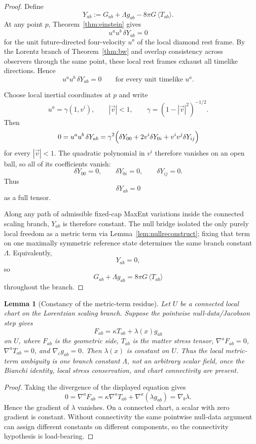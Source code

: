 \documentclass[11pt]{article}
\newtheorem{lemma}[theorem]{Lemma}
\begin{document}
\begin{proof}
Define
\[
Y_{ab}:=G_{ab}+\Lambda g_{ab}-8\pi G\,\langle T_{ab}\rangle.
\]
At any point $p$, Theorem~\ref{thm:einstein} gives
\[
u^a u^b\,\delta Y_{ab}=0
\]
for the unit future-directed four-velocity $u^a$ of the local diamond rest frame. By the Lorentz branch of Theorem~\ref{thm:bw} and overlap consistency across observers through the same point, these local rest frames exhaust all timelike directions. Hence
\[
u^a u^b\,\delta Y_{ab}=0
\qquad
\text{for every unit timelike }u^a.
\]

Choose local inertial coordinates at $p$ and write
\[
u^a=\gamma(1,v^i),
\qquad
|\vec v|<1,
\qquad
\gamma=(1-|\vec v|^2)^{-1/2}.
\]
Then
\[
0=u^a u^b\,\delta Y_{ab}
=
\gamma^2\Bigl(\delta Y_{00}+2v^i\delta Y_{0i}+v^iv^j\delta Y_{ij}\Bigr)
\]
for every $|\vec v|<1$. The quadratic polynomial in $v^i$ therefore vanishes on an open ball, so all of its coefficients vanish:
\[
\delta Y_{00}=0,\qquad
\delta Y_{0i}=0,\qquad
\delta Y_{ij}=0.
\]
Thus
\[
\delta Y_{ab}=0
\]
as a full tensor.

Along any path of admissible fixed-cap MaxEnt variations inside the connected scaling branch, $Y_{ab}$ is therefore constant. The null bridge isolated the only purely local freedom as a metric term via Lemma~\ref{lem:nullreconstruct}; fixing that term on one maximally symmetric reference state determines the same branch constant $\Lambda$. Equivalently,
\[
Y_{ab}=0,
\]
so
\[
G_{ab}+\Lambda g_{ab}=8\pi G\,\langle T_{ab}\rangle
\]
throughout the branch.
\end{proof}

\begin{lemma}[Constancy of the metric-term residue]\label{lem:lambda-constancy}
Let \(U\) be a connected local chart on the Lorentzian scaling branch. Suppose
the pointwise null-data/Jacobson step gives
\[
F_{ab}=\kappa T_{ab}+\lambda(x)g_{ab}
\]
on \(U\), where \(F_{ab}\) is the geometric side, \(T_{ab}\) is the matter
stress tensor, \(\nabla^aF_{ab}=0\), \(\nabla^aT_{ab}=0\), and
\(\nabla_cg_{ab}=0\). Then \(\lambda(x)\) is constant on \(U\). Thus the
local metric-term ambiguity is one branch constant \(\Lambda\), not an
arbitrary scalar field, once the Bianchi identity, local stress conservation,
and chart connectivity are present.
\end{lemma}

\begin{proof}
Taking the divergence of the displayed equation gives
\[
0=\nabla^aF_{ab}
=\kappa\nabla^aT_{ab}+\nabla^a(\lambda g_{ab})
=\nabla_b\lambda.
\]
Hence the gradient of \(\lambda\) vanishes. On a connected chart, a scalar with
zero gradient is constant. Without connectivity the same pointwise null-data
argument can assign different constants on different components, so the
connectivity hypothesis is load-bearing.
\end{proof}
\end{document}
